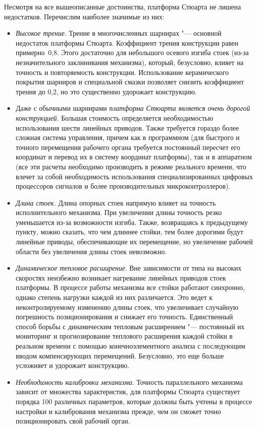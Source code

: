 Несмотря на все вышеописанные достоинства, платформа Стюарта не лишена недостатков. Перечислим наиболее значимые из них:
\begin{itemize}
	\item \textit{Высокое трение}. Трение в многочисленных шарнирах "--- основной недостаток платформы Стюарта. Коэффициент трения конструкции равен примерно~0,8. Этого достаточно для небольшого осевого изгиба стоек (из-за незначительного заклинивания механизма), который, безусловно, влияет на точность и повторяемость конструкции. Использование керамического покрытия шарниров и специальной смазки позволяет снизить коэффициент трения до 0,2, но это существенно удорожает конструкцию.
	
	\item Даже с обычными шарнирами \textit{платформа Стюарта является очень дорогой конструкцией}. Большая стоимость определяется необходимостью использования шести линейных приводов. Также требуется гораздо более сложная система управления, причем как в программном (для быстрого и точного перемещения рабочего органа требуется постоянный пересчет его координат и перевод их в систему координат платформы), так и в аппаратном (все эти расчеты необходимо производить в режиме реального времени, что влечет за собой необходимость использования специализированных цифровых процессоров сигналов и более производительных микроконтроллеров). 
	
	\item \textit{Длина стоек.} Длина опорных стоек напрямую влияет на точность исполнительного механизма. При увеличении длины точность резко уменьшается из-за возможности изгиба. Также, возвращаясь к предыдущему пункту, можно сказать, что чем длиннее стойки, тем более дорогими будут линейные приводы, обеспечивающие их перемещение, но увеличение рабочей области без увеличения длины стоек невозможно.
	
	\item \textit{Динамическое тепловое расширение}. Вне зависимости от типа на высоких скоростях неизбежно возникает нагревание линейных приводов стоек платформы. В процессе работы механизма все стойки работают синхронно, однако степень нагрузки каждой из них различается. Это ведет к неконтролируемому изменению длины стоек, что увеличивает случайную погрешность позиционирования и снижает его точность. Единственный способ борьбы с динамическим тепловым расширением "--- постоянный их мониторинг и прогнозирование теплового расширения каждой стойки в реальном времени с помощью конечноэлементного анализа с последующим вводом компенсирующих перемещений. Безусловно, это еще больше усложняет и удорожает конструкцию.
	
	\item \textit{Необходимость калибровки механизма}. Точность параллельного механизма зависит от множества характеристик, для платформы Стюарта существует порядка 100 различных параметров, которые должны быть учтены в процессе настройки и калибрования механизма прежде, чем он сможет точно позиционировать свой рабочий орган.
\end{itemize}

